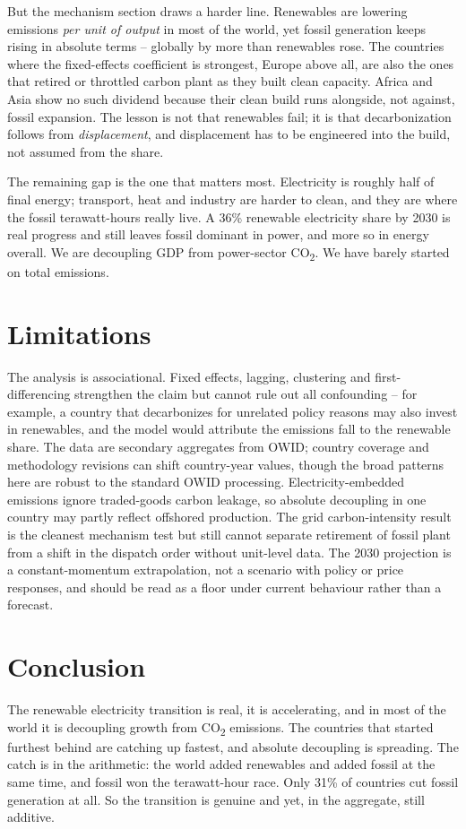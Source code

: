 \documentclass[11pt]{article}
\begin{document}
But the mechanism section draws a harder line. Renewables are lowering emissions \emph{per unit of output} in most of the world, yet fossil generation keeps rising in absolute terms -- globally by more than renewables rose. The countries where the fixed-effects coefficient is strongest, Europe above all, are also the ones that retired or throttled carbon plant as they built clean capacity. Africa and Asia show no such dividend because their clean build runs alongside, not against, fossil expansion. The lesson is not that renewables fail; it is that decarbonization follows from \emph{displacement}, and displacement has to be engineered into the build, not assumed from the share.

The remaining gap is the one that matters most. Electricity is roughly half of final energy; transport, heat and industry are harder to clean, and they are where the fossil terawatt-hours really live. A 36\% renewable electricity share by 2030 is real progress and still leaves fossil dominant in power, and more so in energy overall. We are decoupling GDP from power-sector CO\textsubscript{2}. We have barely started on total emissions.

\section{Limitations}
The analysis is associational. Fixed effects, lagging, clustering and first-differencing strengthen the claim but cannot rule out all confounding -- for example, a country that decarbonizes for unrelated policy reasons may also invest in renewables, and the model would attribute the emissions fall to the renewable share. The data are secondary aggregates from OWID; country coverage and methodology revisions can shift country-year values, though the broad patterns here are robust to the standard OWID processing. Electricity-embedded emissions ignore traded-goods carbon leakage, so absolute decoupling in one country may partly reflect offshored production. The grid carbon-intensity result is the cleanest mechanism test but still cannot separate retirement of fossil plant from a shift in the dispatch order without unit-level data. The 2030 projection is a constant-momentum extrapolation, not a scenario with policy or price responses, and should be read as a floor under current behaviour rather than a forecast.

\section{Conclusion}
The renewable electricity transition is real, it is accelerating, and in most of the world it is decoupling growth from CO\textsubscript{2} emissions. The countries that started furthest behind are catching up fastest, and absolute decoupling is spreading. The catch is in the arithmetic: the world added renewables and added fossil at the same time, and fossil won the terawatt-hour race. Only 31\% of countries cut fossil generation at all. So the transition is genuine and yet, in the aggregate, still additive.
\end{document}
